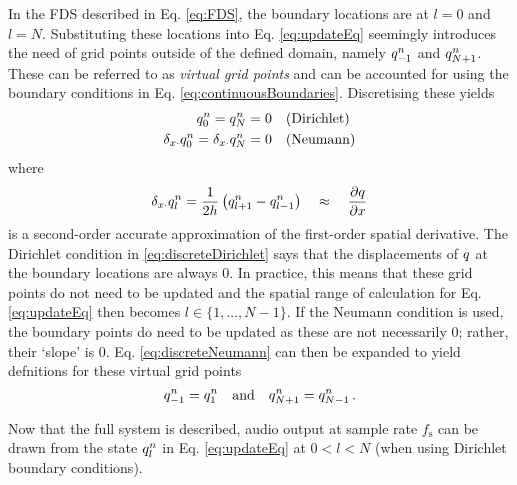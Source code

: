 In the FDS described in Eq. \eqref{eq:FDS}, the boundary locations are at $l = 0$ and $l = N$. Substituting these locations into Eq. \eqref{eq:updateEq} seemingly introduces the need of grid points outside of the defined domain, namely $q_{-1}^n$ and $q_{N+1}^n$. These can be referred to as \textit{virtual grid points} and can be accounted for using the boundary conditions in Eq. \eqref{eq:continuousBoundaries}. Discretising these yields
\begin{subequations}
    \begin{align}
        q_0^n = q_N^n &= 0 \quad\text{(Dirichlet)}\label{eq:discreteDirichlet}\\
        \delta_{x\cdot} q_0^n = \delta_{x\cdot} q_N^n &= 0 \quad \text{(Neumann)}\label{eq:discreteNeumann}
    \end{align}
\end{subequations}
where 
\begin{equation}
    \delta_{x\cdot}q_l^n = \frac{1}{2h}\left(q_{l+1}^n - q_{l-1}^n\right)\quad \approx\quad \frac{\partial q}{\partial x}
\end{equation}
is a second-order accurate approximation of the first-order spatial derivative. The Dirichlet condition in \eqref{eq:discreteDirichlet} says that the displacements of $q$ at the boundary locations are always 0. In practice, this means that these grid points do not need to be updated and the spatial range of calculation for Eq. \eqref{eq:updateEq} then becomes $l \in \{1, \hdots, N-1\}$. If the Neumann condition is used, the boundary points do need to be updated as these are not necessarily $0$; rather, their `slope' is $0$. Eq. \eqref{eq:discreteNeumann} can then be expanded to yield defnitions for these virtual grid points
\begin{equation}\label{eq:neumannSolution}
    q_{-1}^n = q_1^n \quad \text{and} \quad q_{N+1}^n = q_{N-1}^n\,.
\end{equation}

Now that the full system is described, audio output at sample rate $f_\text{s}$ can be drawn from the state $q_l^n$ in Eq. \eqref{eq:updateEq} at $0 < l < N$ (when using Dirichlet boundary conditions). %

